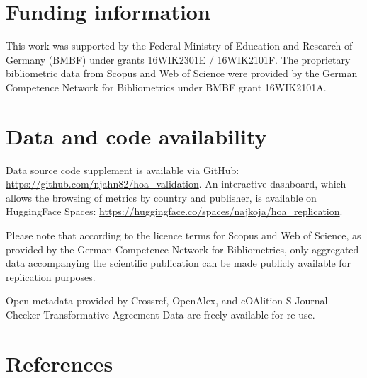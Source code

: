 \documentclass[a4paper,man,floatsintext,longtable,noextraspace,10pt]{apa6}
\begin{document}
\section*{Funding information}\label{funding-information}

This work was supported by the Federal Ministry of Education and
Research of Germany (BMBF) under grants 16WIK2301E / 16WIK2101F. The
proprietary bibliometric data from Scopus and Web of Science were
provided by the German Competence Network for Bibliometrics under BMBF
grant 16WIK2101A.

\section*{Data and code availability}\label{data-and-code-availability}

Data source code supplement is available via GitHub:
\url{https://github.com/njahn82/hoa_validation}. An interactive
dashboard, which allows the browsing of metrics by country and
publisher, is available on HuggingFace Spaces:
\url{https://huggingface.co/spaces/najkoja/hoa_replication}.

Please note that according to the licence terms for Scopus and Web of
Science, as provided by the German Competence Network for Bibliometrics,
only aggregated data accompanying the scientific publication can be made
publicly available for replication purposes.

Open metadata provided by Crossref, OpenAlex, and cOAlition S Journal
Checker Transformative Agreement Data are freely available for re-use.

\section*{References}\label{references}
\end{document}
